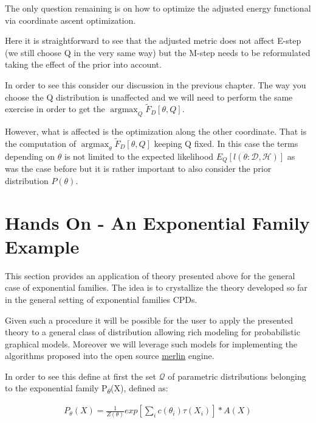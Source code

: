 \documentclass[11pt]{article}
\begin{document}
\begin{article}
The only question remaining is on how to optimize the adjusted
energy functional via coordinate ascent optimization.

Here it is straightforward to see that the adjusted metric does not
affect E-step (we still choose Q in the very same way) but the
M-step needs to be reformulated taking the effect of the prior into
account.

In order to see this consider our discussion in the previous
chapter. The way you choose the Q distribution is unaffected and
we will need to perform the same exercise in order to get the
\(\operatorname*{argmax}_{Q} \tilde{F}_D[\theta, Q]\).

However, what is affected is the optimization along the other
coordinate. That is the computation of
\(\operatorname*{argmax}_{\theta} \tilde{F}_D[\theta, Q]\) keeping Q
fixed. In this case the terms depending on \(\theta\) is not limited to
the expected likelihood \(E_Q[l (\theta: \mathscr{D}, \mathscr{H})]\)
as was the case before but it is rather important to also consider
the prior distribution \(P(\theta)\).





\newpage

\section{Hands On - An Exponential Family Example}
\label{sec:orga74598f}

This section provides an application of theory presented above for
the general case of exponential families. The idea is to
crystallize the theory developed so far in the general setting of
exponential families CPDs.

Given such a procedure it will be possible for the user to apply
the presented theory to a general class of distribution allowing
rich modeling for probabilistic graphical models. Moreover we will
leverage such models for implementing the algorithms proposed into
the open source \href{https://github.com/radum2275/merlin}{merlin} engine. 

In order to see this define at first the set \(\mathscr{Q}\) of
parametric distributions belonging to the exponential family
P\textsubscript{\(\theta\)}(X), defined as:

\begin{align} \label{eq:exponential-family}
P_{\theta}(X) = \frac{1}{Z(\theta)} exp[\sum_i c(\theta_i)\tau(X_i)] * A(X)
\end{align}


\end{article}
\end{document}
